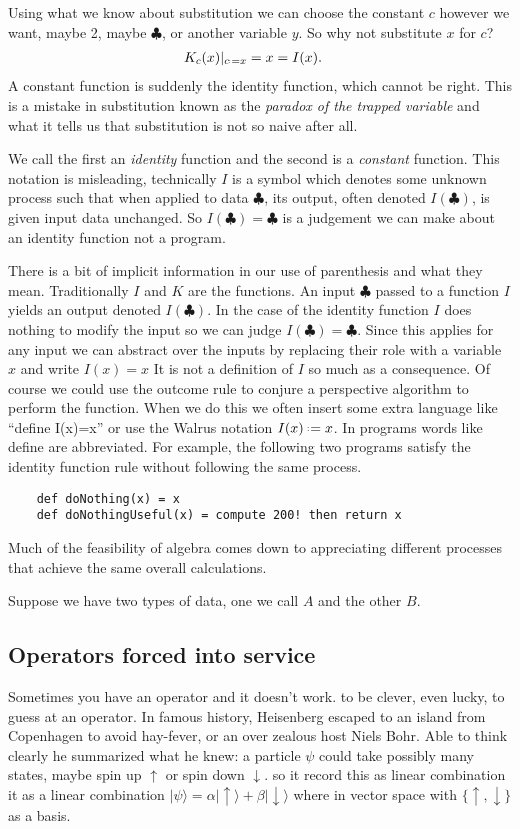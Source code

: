 Using what we know about substitution we can choose the constant $c$
however we want, maybe 2, maybe $\clubsuit$, or another variable $y$.
So why not substitute $x$ for $c$?
\begin{align*}
    K_c(x)|_{c\defeq x} & = x = I(x).
\end{align*}
A constant function is suddenly the identity function, which cannot be 
right.  This is a mistake in substitution known as the \emph{paradox of 
the trapped variable} and what it tells us that substitution is not so 
naive after all.

We call the first an \emph{identity} function and the second is a \emph{constant}
function.  This notation is misleading, technically $I$ is a symbol
which denotes some unknown process such that when applied to data $\clubsuit$,
its output, often denoted $I(\clubsuit)$, is given input data unchanged.
So $I(\clubsuit)=\clubsuit$ is a judgement we can make about an identity 
function not a program.

There is a bit of implicit information in our use 
of parenthesis and what they mean.  Traditionally $I$ and $K$ are 
the functions.  An input $\clubsuit$ passed to a function $I$ 
yields an output denoted $I(\clubsuit)$.  In the case of the identity 
function $I$ does nothing to modify the input so we can judge 
$I(\clubsuit)=\clubsuit$.  Since this applies for any input we 
can abstract over the inputs by replacing their role with a variable 
$x$ and write $I(x)=x$  It is not a definition of $I$ so much as 
a consequence.  Of course we could use the outcome rule to conjure 
a perspective algorithm to perform the function.  When we do this 
we often insert some extra language like ``define I(x)=x'' or 
use the Walrus notation $I(x)\defeq x$.  In programs words like 
define are abbreviated.  For example, the following two programs satisfy
the identity function rule without following the same process.
\begin{lstlisting}
    def doNothing(x) = x 
    def doNothingUseful(x) = compute 200! then return x
\end{lstlisting}
Much of the feasibility of algebra comes down to appreciating 
different processes that achieve the same overall calculations.


Suppose we have two types of data, one we call $A$ and the other $B$.



\subsection{Operators forced into service}
Sometimes you have an operator and it doesn't work.
to be clever, even lucky, to guess at an operator.
In famous history, Heisenberg escaped to an island from Copenhagen 
to avoid hay-fever, or an over zealous host Niels Bohr. 
Able to think clearly he summarized what he knew: a particle $\psi$
could take possibly many states, maybe spin up $\uparrow$ or spin down 
$\downarrow$.  so it record this as linear combination
it as a linear combination $|\psi\rangle = \alpha|\uparrow\rangle+\beta|\downarrow\rangle$
where in vector space with $\{\uparrow,\downarrow\}$ as a basis. 


